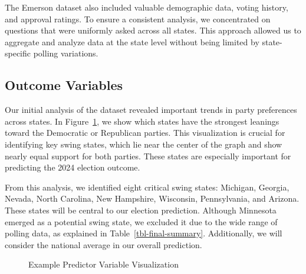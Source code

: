\documentclass[
  letterpaper,
  DIV=11,
  numbers=noendperiod]{scrartcl}
\begin{document}
The Emerson dataset also included valuable demographic data, voting
history, and approval ratings. To ensure a consistent analysis, we
concentrated on questions that were uniformly asked across all states.
This approach allowed us to aggregate and analyze data at the state
level without being limited by state-specific polling variations.

\subsection{Outcome Variables}\label{outcome-variables}

Our initial analysis of the dataset revealed important trends in party
preferences across states. In Figure~\ref{fig-party-results}, we show
which states have the strongest leanings toward the Democratic or
Republican parties. This visualization is crucial for identifying key
swing states, which lie near the center of the graph and show nearly
equal support for both parties. These states are especially important
for predicting the 2024 election outcome.

From this analysis, we identified eight critical swing states: Michigan,
Georgia, Nevada, North Carolina, New Hampshire, Wisconsin, Pennsylvania,
and Arizona. These states will be central to our election prediction.
Although Minnesota emerged as a potential swing state, we excluded it
due to the wide range of polling data, as explained in
Table~\ref{tbl-final-summary}. Additionally, we will consider the
national average in our overall prediction.

\begin{figure}


\caption{\label{fig-party-results}Example Predictor Variable
Visualization}

\end{figure}%
\end{document}
